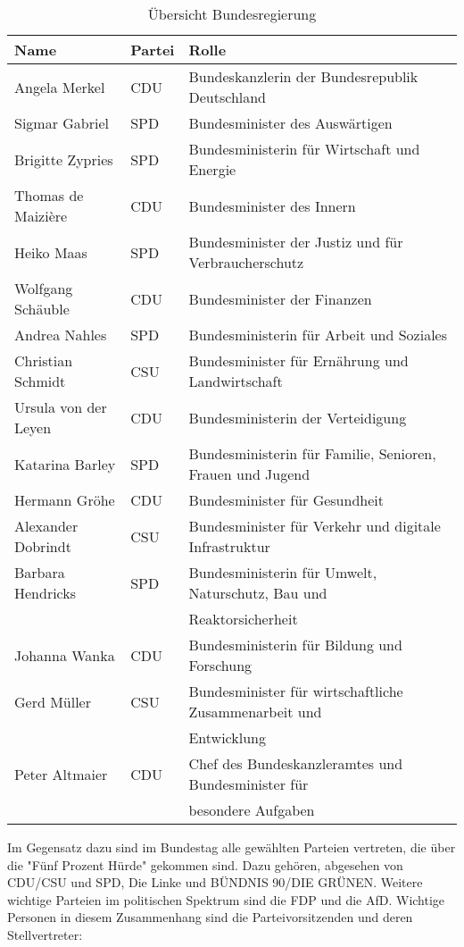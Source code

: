 \begin{table}
\begin{tabular}{lll}
\hline
Name & Partei & Rolle \\
\hline
Angela Merkel & CDU & Bundeskanzlerin der Bundesrepublik Deutschland \\
Sigmar Gabriel & SPD & Bundesminister des Auswärtigen \\
Brigitte Zypries & SPD & Bundesministerin für Wirtschaft und Energie \\
Thomas de Maizière & CDU & Bundesminister des Innern \\
Heiko Maas & SPD & Bundesminister der Justiz und für Verbraucherschutz \\
Wolfgang Schäuble & CDU & Bundesminister der Finanzen \\
Andrea Nahles & SPD & Bundesministerin für Arbeit und Soziales \\
Christian Schmidt & CSU & Bundesminister für Ernährung und Landwirtschaft \\
Ursula von der Leyen & CDU & Bundesministerin der Verteidigung \\
Katarina Barley  & SPD & Bundesministerin für Familie, Senioren, Frauen und Jugend \\
Hermann Gröhe & CDU & Bundesminister für Gesundheit \\
Alexander Dobrindt & CSU & Bundesminister für Verkehr und digitale Infrastruktur \\
Barbara Hendricks & SPD & Bundesministerin für Umwelt, Naturschutz, Bau und  \\
& & Reaktorsicherheit \\
Johanna Wanka & CDU & Bundesministerin für Bildung und Forschung \\
Gerd Müller & CSU & Bundesminister für wirtschaftliche Zusammenarbeit und \\
& & Entwicklung \\
Peter Altmaier & CDU & Chef des Bundeskanzleramtes und Bundesminister für  \\
& & besondere Aufgaben \\
\hline
\end{tabular}
\caption{Übersicht Bundesregierung}
\end{table}
Im Gegensatz dazu sind im Bundestag alle gewählten Parteien vertreten, die über die "Fünf Prozent Hürde" gekommen sind. Dazu gehören, abgesehen von CDU/CSU und SPD, Die Linke und BÜNDNIS 90/DIE GRÜNEN. Weitere wichtige Parteien im politischen Spektrum sind die FDP und die AfD. Wichtige Personen in diesem Zusammenhang sind die Parteivorsitzenden und deren Stellvertreter: \\
